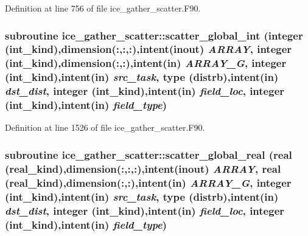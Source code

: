 Definition at line 756 of file ice\_\-gather\_\-scatter.F90.\hypertarget{namespaceice__gather__scatter_a73a3c6d85b75937079388303c18732cb}{
\subsubsection[{scatter\_\-global\_\-int}]{\setlength{\rightskip}{0pt plus 5cm}subroutine ice\_\-gather\_\-scatter::scatter\_\-global\_\-int (integer (int\_\-kind),dimension(:,:,:),intent(inout) {\em ARRAY}, \/  integer (int\_\-kind),dimension(:,:),intent(in) {\em ARRAY\_\-G}, \/  integer (int\_\-kind),intent(in) {\em src\_\-task}, \/  type (distrb),intent(in) {\em dst\_\-dist}, \/  integer (int\_\-kind),intent(in) {\em field\_\-loc}, \/  integer (int\_\-kind),intent(in) {\em field\_\-type})}}
\label{namespaceice__gather__scatter_a73a3c6d85b75937079388303c18732cb}


Definition at line 1526 of file ice\_\-gather\_\-scatter.F90.\hypertarget{namespaceice__gather__scatter_a55328cf7afed78a137ab75bd786a4d79}{
\subsubsection[{scatter\_\-global\_\-real}]{\setlength{\rightskip}{0pt plus 5cm}subroutine ice\_\-gather\_\-scatter::scatter\_\-global\_\-real (real (real\_\-kind),dimension(:,:,:),intent(inout) {\em ARRAY}, \/  real (real\_\-kind),dimension(:,:),intent(in) {\em ARRAY\_\-G}, \/  integer (int\_\-kind),intent(in) {\em src\_\-task}, \/  type (distrb),intent(in) {\em dst\_\-dist}, \/  integer (int\_\-kind),intent(in) {\em field\_\-loc}, \/  integer (int\_\-kind),intent(in) {\em field\_\-type})}}
\label{namespaceice__gather__scatter_a55328cf7afed78a137ab75bd786a4d79}


